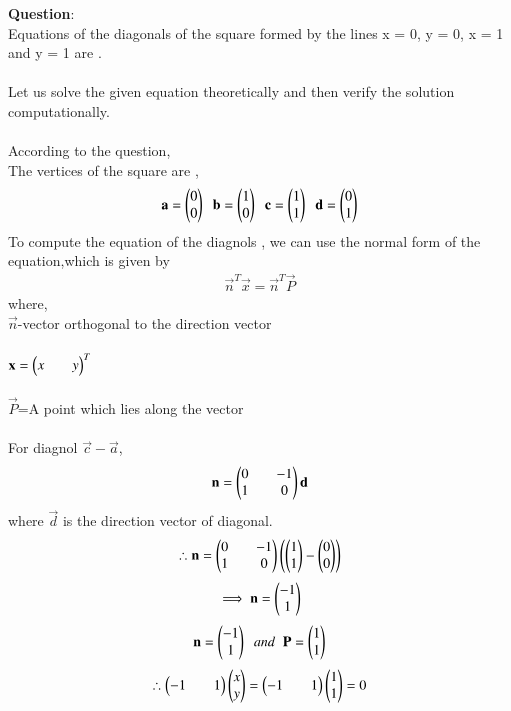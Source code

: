 \documentclass[journal]{IEEEtran}
\begin{document}
\textbf{Question}:\\
Equations of the diagonals of the square formed by the lines x = 0, y = 0, x = 1 and y = 1 are \underline{\hspace{2cm}}.\\
\solution \\
Let us solve the given equation theoretically and then verify the solution computationally.\\
\\
According to the question,\\
The vertices of the square are ,
\begin{align*}
    \mathbf{a}=\begin{pmatrix}0\\0\end{pmatrix}\;\;\mathbf{b}=\begin{pmatrix}1\\0\end{pmatrix}\;\;\mathbf{c}=\begin{pmatrix}1\\1\end{pmatrix}\;\;\mathbf{d}=\begin{pmatrix}0\\1\end{pmatrix}
\end{align*}
To compute the equation of the diagnols , we can use the normal form of the equation,which is given by
\begin{align*}
    \vec{n}^T\vec{x}=\vec{n}^T\vec{P}
\end{align*}
where,\\
\hspace*{4em}  $\vec{n}$-vector orthogonal to the direction vector\\
\\
\hspace*{4em}  $\mathbf{x}=\begin{pmatrix}x&&y\end{pmatrix}^T$ \\
\\
\hspace*{4em}  $\vec{P}$=A point which lies along the vector\\
\\
For diagnol $\vec{c}-\vec{a}$,
\begin{align*}
    \mathbf{n}=\begin{pmatrix}0&&-1\\1&&0\end{pmatrix}\mathbf{d}
\end{align*}
where $\vec{d}$ is the direction vector of diagonal.
\begin{align*}
    \therefore \mathbf{n}=\begin{pmatrix}0&&-1\\1&&0\end{pmatrix}\left(\begin{pmatrix}1\\1\end{pmatrix}-\begin{pmatrix}0\\0\end{pmatrix}\right)
\end{align*}
\begin{align*}
    \implies \mathbf{n}=\begin{pmatrix}-1\\1\end{pmatrix}
\end{align*}
\begin{align*}
    \mathbf{n}=\begin{pmatrix}-1\\1\end{pmatrix}\;\;and\;\;\mathbf{P}=\begin{pmatrix}1\\1\end{pmatrix}
\end{align*}
\begin{align*}
    \therefore \begin{pmatrix}-1&&1\end{pmatrix}\begin{pmatrix}x\\y\end{pmatrix}=\begin{pmatrix}-1&&1\end{pmatrix}\begin{pmatrix}1\\1\end{pmatrix}=0
\end{align*}
\newpage
\vspace*{0.25cm}
\end{document}
